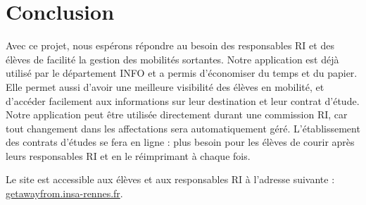 \chapter{Conclusion}

Avec ce projet, nous espérons répondre au besoin des responsables RI et des élèves de facilité la gestion des mobilités sortantes. Notre application est déjà utilisé par le département INFO et a permis d'économiser du temps et du papier. Elle permet aussi d'avoir une meilleure visibilité des élèves en mobilité, et d'accéder facilement aux informations sur leur destination et leur contrat d'étude. Notre application peut être utilisée directement durant une commission RI, car tout changement dans les affectations sera automatiquement géré. L'établissement des contrats d'études se fera en ligne : plus besoin pour les élèves de courir après leurs responsables RI et en le réimprimant à chaque fois.

Le site est accessible aux élèves et aux responsables RI à l'adresse suivante : \href{https://getawayfrom.insa-rennes.fr}{getawayfrom.insa-rennes.fr}.